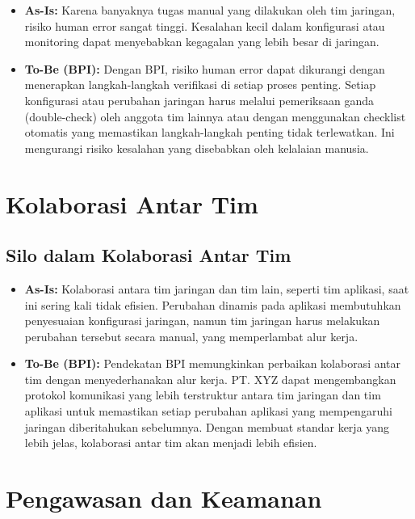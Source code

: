 \begin{itemize}
    \item \textbf{As-Is:} Karena banyaknya tugas manual yang dilakukan oleh tim jaringan, risiko human error sangat tinggi. Kesalahan kecil dalam konfigurasi atau monitoring dapat menyebabkan kegagalan yang lebih besar di jaringan.

    \item \textbf{To-Be (BPI):} Dengan BPI, risiko human error dapat dikurangi dengan menerapkan langkah-langkah verifikasi di setiap proses penting. Setiap konfigurasi atau perubahan jaringan harus melalui pemeriksaan ganda (double-check) oleh anggota tim lainnya atau dengan menggunakan checklist otomatis yang memastikan langkah-langkah penting tidak terlewatkan. Ini mengurangi risiko kesalahan yang disebabkan oleh kelalaian manusia.
\end{itemize}

\section{Kolaborasi Antar Tim}

\subsection{Silo dalam Kolaborasi Antar Tim}

\begin{itemize}
    \item \textbf{As-Is:} Kolaborasi antara tim jaringan dan tim lain, seperti tim aplikasi, saat ini sering kali tidak efisien. Perubahan dinamis pada aplikasi membutuhkan penyesuaian konfigurasi jaringan, namun tim jaringan harus melakukan perubahan tersebut secara manual, yang memperlambat alur kerja.

    \item \textbf{To-Be (BPI):} Pendekatan BPI memungkinkan perbaikan kolaborasi antar tim dengan menyederhanakan alur kerja. PT. XYZ dapat mengembangkan protokol komunikasi yang lebih terstruktur antara tim jaringan dan tim aplikasi untuk memastikan setiap perubahan aplikasi yang mempengaruhi jaringan diberitahukan sebelumnya. Dengan membuat standar kerja yang lebih jelas, kolaborasi antar tim akan menjadi lebih efisien.
\end{itemize}

\section{Pengawasan dan Keamanan}

